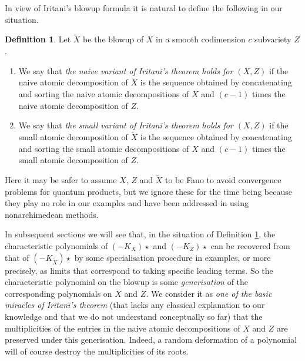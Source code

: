 \documentclass[11pt]{amsart}
\theoremstyle{plain}
\numberwithin{equation}{section}
\theoremstyle{definition}
\newtheorem{definition}[theorem]{Definition}
\theoremstyle{remark}
\begin{document}
In view of Iritani's blowup formula \cite{Iritani23} it is natural to define the following in our situation.  


\begin{definition}\label{dIritaniMorePrecise}
Let $\widetilde{X}$ be the blowup of $X$ in a smooth codimension $c$ subvariety $Z$. 

\begin{enumerate}
\item
We say that \emph{the naive variant of Iritani's theorem holds for $(X, Z)$}  if the naive atomic decomposition of $\widetilde{X}$ is the sequence obtained by concatenating and sorting the naive atomic decompositions of $X$ and $(c-1)$ times the naive atomic decomposition of $Z$. 
\item 
We say that \emph{the small variant of Iritani's theorem holds for $(X, Z)$}  if the small atomic decomposition of $\widetilde{X}$ is the sequence obtained by concatenating and sorting the small atomic decompositions of $X$ and $(c-1)$ times the small  atomic decomposition of $Z$. 
\end{enumerate}
\end{definition}

Here it may be safer to assume $X$, $Z$ and $\widetilde{X}$ to be Fano to avoid convergence problems for quantum products, but we ignore these for the time being because they play no role in our examples and have been addressed in \cite{KKPY25} using nonarchimedean methods. 


In subsequent sections we will see that, in the situation of Definition  \ref{dIritaniMorePrecise}, the characteristic polynomials of $(-K_X)\star$ and $(-K_Z)\star$ can be recovered from that of $(-K_{\widetilde{X}})\star$ by some specialisation procedure in examples, or more precisely, as limits that correspond to taking specific leading terms. So the characteristic polynomial on the blowup is some \emph{generisation} of the corresponding polynomials on $X$ and $Z$. We consider it as \emph{one of the basic miracles of Iritani's theorem} (that lacks any classical explanation to our knowledge and that we do not understand conceptually so far) that the multiplicities of the entries in the naive atomic decompositions of $X$ and $Z$ are preserved under this generisation. Indeed, a random deformation of a polynomial will of course destroy the multiplicities of its roots. 
\end{document}
